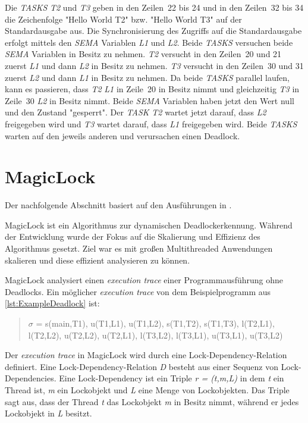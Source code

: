 Die \emph{TASKS} \emph{T2} und \emph{T3} geben in den Zeilen~22 bis 24 und in
den Zeilen~32 bis 34 die Zeichenfolge "Hello World T2" bzw. "Hello World T3" auf
der Standardausgabe aus. Die Synchronisierung des Zugriffs auf die
Standardausgabe erfolgt mittels den \emph{SEMA} Variablen \emph{L1} und
\emph{L2}. Beide \emph{TASKS} versuchen beide \emph{SEMA} Variablen in Besitz zu
nehmen. \emph{T2} versucht in den Zeilen~20 und 21 zuerst \emph{L1} und dann
\emph{L2} in Besitz zu nehmen. \emph{T3} versucht in den Zeilen~30 und 31 zuerst
\emph{L2} und dann \emph{L1} in Besitz zu nehmen. Da beide \emph{TASKS} parallel
laufen, kann es passieren, dass \emph{T2} \emph{L1} in Zeile~20 in Besitz nimmt
und gleichzeitig \emph{T3} in Zeile~30 \emph{L2} in Besitz nimmt. Beide
\emph{SEMA} Variablen haben jetzt den Wert null und den Zustand "gesperrt". Der
\emph{TASK} \emph{T2} wartet jetzt darauf, dass \emph{L2} freigegeben wird und
\emph{T3} wartet darauf, dass \emph{L1} freigegeben wird. Beide \emph{TASKS}
warten auf den jeweils anderen und verursachen einen Deadlock.

\section{MagicLock}
\label{section:MagicLock}
Der nachfolgende Abschnitt basiert auf den Ausführungen in \autocite{MagicLock}.

MagicLock ist ein Algorithmus zur dynamischen Deadlockerkennung. Während der
Entwicklung wurde der Fokus auf die Skalierung und Effizienz des Algorithmus
gesetzt. Ziel war es mit großen Multithreaded Anwendungen skalieren und diese
effizient analysieren zu können.

MagicLock analysiert einen \emph{execution trace} einer Programmausführung ohne
Deadlocks. Ein möglicher \emph{execution trace} von dem Beispielprogramm aus
\cref{lst:ExampleDeadlock} ist:
\begin{quote}
  \textbf{$\sigma$} = s(main,T1), u(T1,L1), u(T1,L2), s(T1,T2), s(T1,T3),
  l(T2,L1), l(T2,L2), u(T2,L2), u(T2,L1), l(T3,L2), l(T3,L1), u(T3,L1), u(T3,L2)
\end{quote}
Der \emph{execution trace} in MagicLock wird durch eine Lock-Dependency-Relation
definiert. Eine Lock-Dependency-Relation \emph{D} besteht aus einer Sequenz von
Lock-Dependencies. Eine Lock-Dependency ist ein Triple \emph{r = (t,m,L)} in dem
\emph{t} ein Thread ist, \emph{m} ein Lockobjekt und \emph{L} eine Menge von
Lockobjekten. Das Triple sagt aus, dass der Thread \emph{t} das Lockobjekt
\emph{m} in Besitz nimmt, während er jedes Lockobjekt in \emph{L} besitzt.

